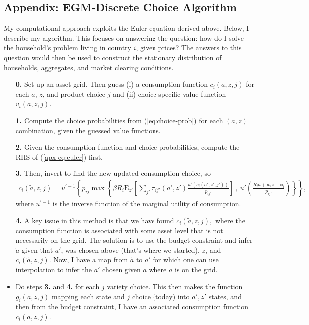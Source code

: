 \documentclass[12pt,pdftex]{article}
\begin{document}
\begin{onehalfspacing}
\section{Appendix: EGM-Discrete Choice Algorithm}

My computational approach exploits the Euler equation derived above. Below, I describe my algorithm. This focuses on answering the question: how do I solve the household's problem living in country $i$, given prices? The answers to this question would then be used to construct the stationary distribution of households, aggregates, and market clearing conditions.
\begin{itemize}
\item[\textbf{0.}] Set up an asset grid. Then guess (i) a consumption function $c_{i}(a,z,j)$ for each $a$, $z$, and product choice $j$ and (ii) choice-specific value function $v_{i}(a,z,j)$.

\item[\textbf{1.}] Compute the choice probabilities from (\ref{eq:choice-prob}) for each $(a,z)$ combination, given the guessed value functions.

\item[\textbf{2.}] Given the consumption function and choice probabilities, compute the RHS of (\ref{apx-eq:euler}) first.

\item[\textbf{3.}] Then, invert to find the new updated consumption choice, so
{\small
\begin{align}
c_{i}(\tilde a, z, j) = u^{' -1}\left\{ p_{ij} \max \left\{ \beta R_{i} \mathrm{E}_{z'} \left[ \sum_{j'} \pi_{ij'}(a', z') \frac{u'(c_{i}(a', z',j'))}{p_{ij'}} \right] \ , \  u' \left( \frac{R_i a + w_i z - \phi_{i}}{p_{ij'}} \right) \right \} \right \},
\end{align}}
where $u^{' -1}$ is the inverse function of the marginal utility of consumption.

\item[\textbf{4.}] A key issue in this method is that we have found  $c_{i}(\tilde a, z, j),$ where the consumption function is associated with some asset level that is not necessarily on the grid. The solution is to use the budget constraint and infer $\tilde a$ given that $a'$, was chosen above (that's where we started), $z$, and $c_{i}(\tilde a, z, j)$. Now, I have a map from $\tilde a$ to $a'$ for which one can use interpolation to infer the $a'$ chosen given $a$ where $a$ is on the grid.

\item Do steps \textbf{3.} and \textbf{4.} for each $j$ variety choice. This then makes the function $g_{i}(a,z,j)$ mapping each state and $j$ choice (today) into $a', z'$ states, and then from the budget constraint, I have an associated consumption function $c_{i}(a,z,j)$.


\end{itemize}
\end{onehalfspacing}
\end{document}
